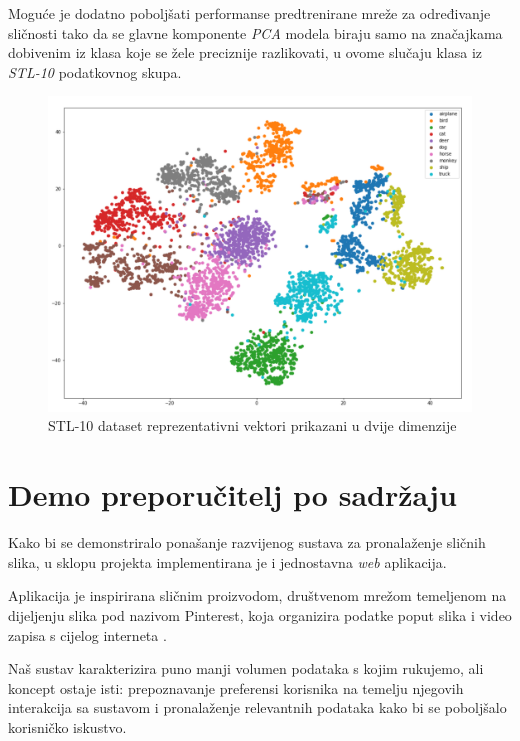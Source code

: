 \documentclass[times, utf8, proizvoljni, numeric]{fer}
\begin{document}
Moguće je dodatno poboljšati performanse predtrenirane mreže za određivanje sličnosti tako da se glavne komponente \textit{PCA} modela biraju samo na značajkama dobivenim iz klasa koje se žele preciznije razlikovati, u ovome slučaju klasa iz \textit{STL-10} podatkovnog skupa.

\begin{figure}[!ht]
	\begin{center}
		\captionsetup{justification=centering}
		\includegraphics[width=1.\textwidth]{./imgs/stl_10_tsne.png}
		\caption{STL-10 dataset reprezentativni vektori prikazani u dvije dimenzije}
		\label{fg:stl_10_tsne}
	\end{center}
\end{figure}

\chapter{Demo preporučitelj po sadržaju}

Kako bi se demonstriralo ponašanje razvijenog sustava za pronalaženje sličnih slika, u sklopu projekta implementirana je i jednostavna \textit{web} aplikacija. 

Aplikacija je inspirirana sličnim proizvodom, društvenom mrežom temeljenom na dijeljenju slika pod nazivom Pinterest, koja organizira podatke poput slika i video zapisa s cijelog interneta \cite{wiki-pintrest}. 

Naš sustav karakterizira puno manji volumen podataka s kojim rukujemo, ali koncept ostaje isti: prepoznavanje preferensi korisnika na temelju njegovih interakcija sa sustavom i pronalaženje relevantnih podataka kako bi se poboljšalo korisničko iskustvo.
\end{document}
